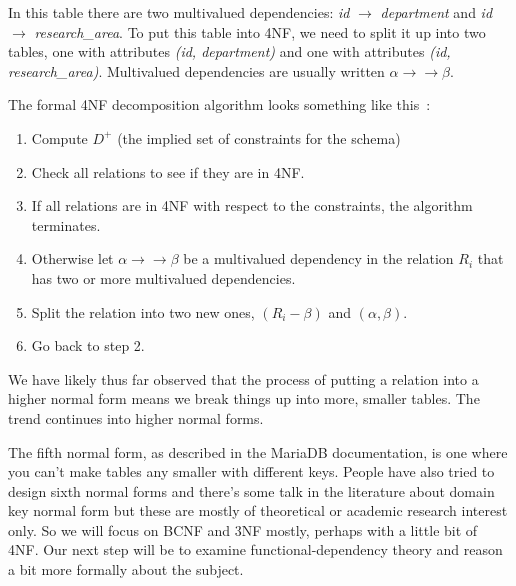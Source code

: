 In this table there are two multivalued dependencies:  \textit{id} $\rightarrow$ \textit{department} and \textit{id} $\rightarrow$ \textit{research\_area}. To put this table into 4NF, we need to split it up into two tables, one with attributes \textit{(id, department)} and one with attributes \textit{(id, research\_area)}. Multivalued dependencies are usually written $\alpha \rightarrow\rightarrow \beta$.

The formal 4NF decomposition algorithm looks something like this~\cite{dsc}:

\begin{enumerate}
	\item Compute $D^{+}$ (the implied set of constraints for the schema)
	\item Check all relations to see if they are in 4NF.
	\item If all relations are in 4NF with respect to the constraints, the algorithm terminates.
	\item Otherwise let $\alpha \rightarrow\rightarrow \beta$ be a multivalued dependency in the relation $R_{i}$ that has two or more multivalued dependencies. 
	\item Split the relation into two new ones, $(R_{i} - \beta)$ and $(\alpha, \beta)$.
	\item Go back to step 2.
\end{enumerate}


We have likely thus far observed that the process of putting a relation into a higher normal form means we break things up into more, smaller tables. The trend continues into higher normal forms.

The fifth normal form, as described in the MariaDB documentation, is one where you can't make tables any smaller with different keys. People have also tried to design sixth normal forms and there's some talk in the literature about domain key normal form but these are mostly of theoretical or academic research interest only. So we will focus on BCNF and 3NF mostly, perhaps with a little bit of 4NF. Our next step will be to examine functional-dependency theory and reason a bit more formally about the subject.





